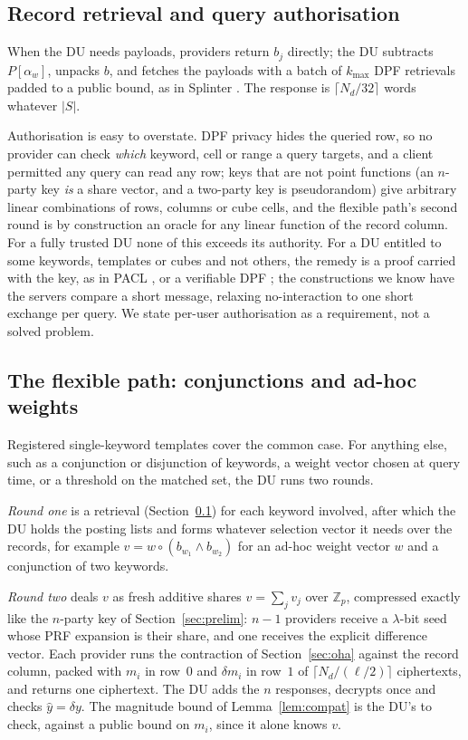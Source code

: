 \documentclass[a4paper,fleqn]{cas-sc}
\begin{document}
\subsection{Record retrieval and query authorisation}
\label{sec:auth}
When the DU needs payloads, providers return $b_j$ directly; the DU subtracts
$P[\alpha_w]$, unpacks $b$, and fetches the payloads with a batch of
$k_{\max}$ DPF retrievals padded to a public bound, as in Splinter
\citep{splinter}. The response is $\lceil N_d/32\rceil$ words whatever $|S|$.

Authorisation is easy to overstate. DPF privacy hides the queried row, so no
provider can check \emph{which} keyword, cell or range a query targets, and a
client permitted any query can read any row; keys that are not point functions
(an $n$-party key \emph{is} a share vector, and a two-party key is
pseudorandom) give arbitrary linear combinations of rows, columns or cube
cells, and the flexible path's second round is by construction an oracle for
any linear function of the record column. For a fully trusted DU none of this
exceeds its authority. For a DU entitled to some keywords, templates or cubes
and not others, the remedy is a proof carried with the key, as in PACL
\citep{pacl}, or a verifiable DPF \citep{decastro2022lightweight}; the
constructions we know \citep{boneh2021lightweight} have the servers compare a
short message, relaxing no-interaction to one short exchange per query. We
state per-user authorisation as a requirement, not a solved problem.

\subsection{The flexible path: conjunctions and ad-hoc weights}
\label{sec:flex}
Registered single-keyword templates cover the common case. For anything else,
such as a conjunction or disjunction of keywords, a weight vector chosen at
query time, or a threshold on the matched set, the DU runs two rounds.

\emph{Round one} is a retrieval (Section~\ref{sec:auth}) for each keyword
involved, after which the DU holds the posting lists and forms whatever
selection vector it needs over the records, for example
$v=w\circ(b_{w_1}\wedge b_{w_2})$ for an ad-hoc weight vector $w$ and a
conjunction of two keywords.

\emph{Round two} deals $v$ as fresh additive shares $v=\sum_jv_j$ over
$\mathbb{Z}_p$, compressed exactly like the $n$-party key of
Section~\ref{sec:prelim}: $n-1$ providers receive a $\lambda$-bit seed whose
PRF expansion is their share, and one receives the explicit difference vector.
Each provider runs the contraction of Section~\ref{sec:oha} against the record
column, packed with $m_i$ in row~$0$ and $\delta m_i$ in row~$1$ of
$\lceil N_d/(\ell/2)\rceil$ ciphertexts, and returns one ciphertext. The DU
adds the $n$ responses, decrypts once and checks $\hat y=\delta y$. The
magnitude bound of Lemma~\ref{lem:compat} is the DU's to check, against a
public bound on $m_i$, since it alone knows $v$.
\end{document}
